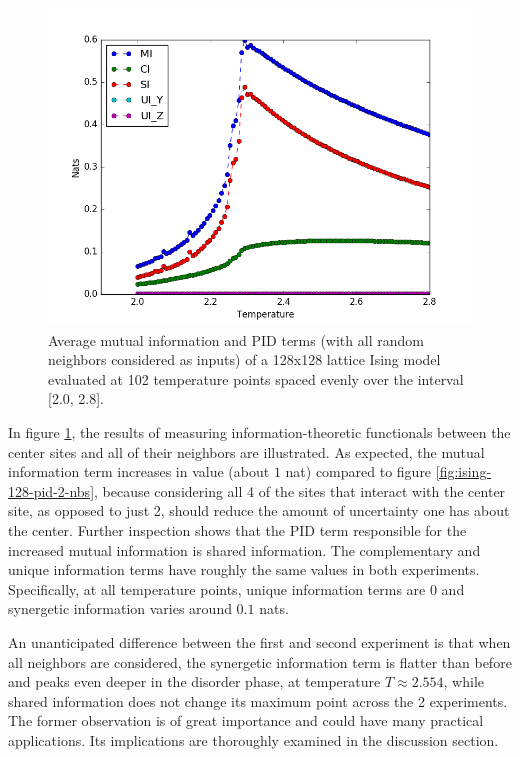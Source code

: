 \documentclass[12pt]{article}
\begin{document}
\begin{figure} [h]
\begin{center}
\includegraphics[width=.9\textwidth]{ising-128-pid-4-nbs}
\caption{Average mutual information and PID terms (with all random neighbors considered as inputs) of a 128x128 lattice Ising model evaluated at 102 temperature points spaced evenly over the interval [2.0, 2.8].}
\label{fig:ising-128-pid-4-nbs}
\end{center}
\end{figure}

In figure \ref{fig:ising-128-pid-4-nbs}, the results of measuring information-theoretic functionals between the center sites and all of their neighbors are illustrated. As expected, the mutual information term increases in value (about $1$ nat) compared to figure \ref{fig:ising-128-pid-2-nbs}, because considering all 4 of the sites that interact with the center site, as opposed to just 2, should reduce the amount of uncertainty one has about the center. Further inspection shows that the PID term responsible for the increased mutual information is shared information. The complementary and unique information terms have roughly the same values in both experiments. Specifically, at all temperature points, unique information terms are $0$ and synergetic information varies around $0.1$ nats. 

An unanticipated difference between the first and second experiment is that when all neighbors are considered, the synergetic information term is flatter than before and peaks even deeper in the disorder phase, at temperature $T \approx 2.554$, while shared information does not change its maximum point across the 2 experiments. The former observation is of great importance and could have many practical applications. Its implications are thoroughly examined in the discussion section. 
\end{document}
